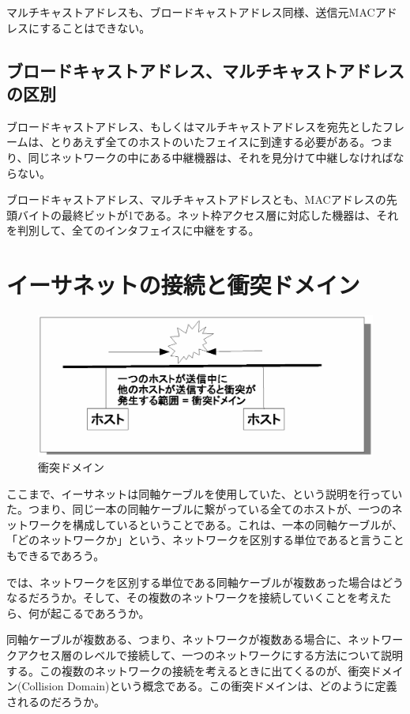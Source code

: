 マルチキャストアドレスも、ブロードキャストアドレス同様、送信元MACアドレスにすることはできない。

\subsection{ブロードキャストアドレス、マルチキャストアドレスの区別}
ブロードキャストアドレス、もしくはマルチキャストアドレスを宛先としたフレームは、とりあえず全てのホストのいたフェイスに到達する必要がある。つまり、同じネットワークの中にある中継機器は、それを見分けて中継しなければならない。

ブロードキャストアドレス、マルチキャストアドレスとも、MACアドレスの先頭バイトの最終ビットが1である。ネット枠アクセス層に対応した機器は、それを判別して、全てのインタフェイスに中継をする。

\section{イーサネットの接続と衝突ドメイン}

\begin{figure}[htbp]
	\includegraphics[width=12cm,clip]{draw/collisiondomain.eps}
	\caption{衝突ドメイン}
	\label{fig:collisiondomain}
\end{figure}

ここまで、イーサネットは同軸ケーブルを使用していた、という説明を行っていた。つまり、同じ一本の同軸ケーブルに繋がっている全てのホストが、一つのネットワークを構成しているということである。これは、一本の同軸ケーブルが、「どのネットワークか」という、ネットワークを区別する単位であると言うこともできるであろう。

では、ネットワークを区別する単位である同軸ケーブルが複数あった場合はどうなるだろうか。そして、その複数のネットワークを接続していくことを考えたら、何が起こるであろうか。

同軸ケーブルが複数ある、つまり、ネットワークが複数ある場合に、ネットワークアクセス層のレベルで接続して、一つのネットワークにする方法について説明する。この複数のネットワークの接続を考えるときに出てくるのが、衝突ドメイン(Collision Domain)という概念である。この衝突ドメインは、どのように定義されるのだろうか。


